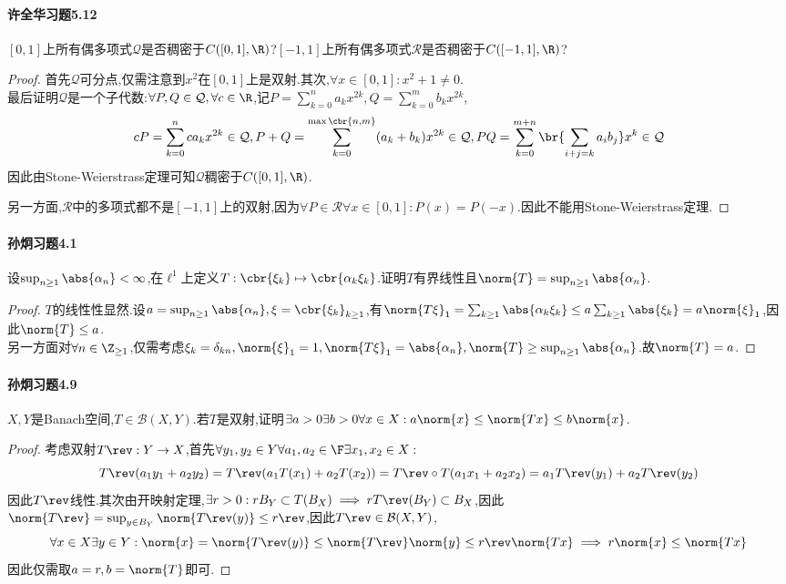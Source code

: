 \documentclass{article}
\begin{document}
\paragraph{许全华习题5.12}$[0,1]$上所有偶多项式$\mathcal{Q}$是否稠密于$C([0,1],\R)$?$[-1,1]$上所有偶多项式$\mathcal{R}$是否稠密于$C([-1,1],\R)$?
\begin{proof}
    首先$\mathcal{Q}$可分点,仅需注意到$x^2$在$[0,1]$上是双射.其次,$\forall x\in [0,1]:x^2+1\neq 0$.\\
    最后证明$\mathcal{Q}$是一个子代数:$\forall P,Q\in \mathcal{Q},\forall c\in \R$,记$P=\sum_{k= 0}^na_kx^{2k},Q=\sum_{k= 0}^mb_kx^{2k}$,
    $$cP=\sum_{k= 0}^nca_kx^{2k}\in\mathcal{Q},P+Q=\sum_{k= 0}^{\max\cbr{n,m}}(a_k+b_k)x^{2k}\in\mathcal{Q}, PQ=\sum_{k= 0}^{m+n}\br{\sum_{i+j=k}a_ib_j}x^{k}\in\mathcal{Q}$$
    因此由Stone-Weierstrass定理可知$\mathcal{Q}$稠密于$C([0,1],\R)$.

    另一方面,$\mathcal{R}$中的多项式都不是$[-1,1]$上的双射,因为$\forall P\in \mathcal{R}\forall x\in [0,1]:P(x)=P(-x)$.因此不能用Stone-Weierstrass定理.
\end{proof}

\paragraph{孙炯习题4.1}设$\sup_{n\geq 1}\abs{\alpha_n}<\infty$,在$\ell^1$上定义$T:\cbr{\xi_k}\mapsto \cbr{\alpha_k\xi_k}$.证明$T$有界线性且$\norm{T}=\sup_{n\geq 1}\abs{\alpha_n}$.
\begin{proof}
    $T$的线性性显然.设$a=\sup_{n\geq 1}\abs{\alpha_n},\xi=\cbr{\xi_k}_{k\geq 1}$,有$\norm{T\xi}_1=\sum_{k\geq 1}\abs{\alpha_k\xi_k}\leq a\sum_{k\geq 1}\abs{\xi_k}=a\norm{\xi}_1$,因此$\norm{T}\leq a$.\\
    另一方面对$\forall n\in \Z_{\geq 1}$,仅需考虑$\xi_k=\delta_{kn},\norm{\xi}_1=1,\norm{T\xi}_1=\abs{\alpha_n},\norm{T}\geq\sup_{n\geq 1}\abs{\alpha_n}$.故$\norm{T}=a$.
\end{proof}

\paragraph{孙炯习题4.9}$X,Y$是Banach空间,$T\in \mathcal{B}(X,Y)$.若$T$是双射,证明$\exists a>0\exists b>0\forall x\in X:a\norm{x}\leq \norm{Tx}\leq b\norm{x}$.
\begin{proof}
    考虑双射$T\rev:Y\to X$,首先$\forall y_1,y_2\in Y\forall a_1,a_2\in \F\exists x_1,x_2\in X:$$$T\rev(a_1y_1+a_2y_2)=T\rev(a_1T(x_1)+a_2T(x_2))=T\rev\circ T(a_1x_1+a_2x_2)=a_1T\rev(y_1)+a_2T\rev(y_2)$$
    因此$T\rev$线性.其次由开映射定理,$\exists r>0:rB_Y\subset T(B_X)\implies rT\rev(B_Y)\subset B_X$,因此$\norm{T\rev}=\sup_{y\in B_Y}\norm{T\rev(y)}\leq r\rev$,因此$T\rev\in \mathcal{B}(X,Y)$,
    $$\forall x\in X\exists y\in Y:\norm{x}=\norm{T\rev(y)}\leq \norm{T\rev}\norm{y}\leq r\rev\norm{Tx}\implies r\norm{x}\leq \norm{Tx}$$
    因此仅需取$a=r,b=\norm{T}$即可.
\end{proof}
\end{document}
